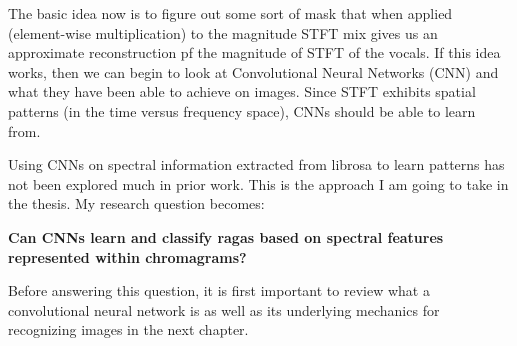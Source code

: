 The basic idea now is to figure out some sort of mask that when applied (element-wise multiplication) to the magnitude STFT mix gives us an approximate reconstruction pf the magnitude of STFT of the vocals. If this idea works, then we can begin to look at Convolutional Neural Networks (CNN) and what they have been able to achieve on images. Since STFT exhibits spatial patterns (in the time versus frequency space), CNNs should be able to learn from.

\par

Using CNNs on spectral information extracted from librosa to learn patterns has not been explored much in prior work. This is the approach I am going to take in the thesis. My research question becomes:  \par

\textbf{Can CNNs learn and classify ragas based on spectral features represented within chromagrams?}

Before answering this question, it is first important to review what a convolutional neural network is as well as its underlying mechanics for recognizing images in the next chapter.
